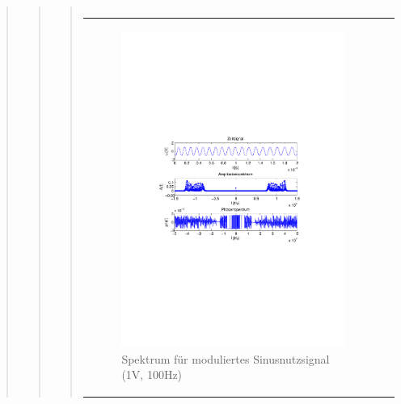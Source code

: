 \begin{quote}
\begin{quote}
\begin{quote}
\begin{center}
\begin{tabular}{ll}
            \end{tabular}
            \end{center}
        	
        	   
        	       \begin{center}
            \begin{tabular}{ll}

            \hspace{-14em}
                \begin{minipage}{0.6\textwidth}

                    \begin{figure}[H]
                        \label{fig:}
                        \includegraphics[scale=0.5, trim = 2cm 6.5cm 1.5cm
                        8.5cm, clip]{./Bilder/sin_a1_f100}
                        \caption{Spektrum für moduliertes Sinusnutzsignal (1V,
                        100Hz)}
                    \end{figure}


\end{minipage}
\end{tabular}
\end{center}
\end{quote}
\end{quote}
\end{quote}
